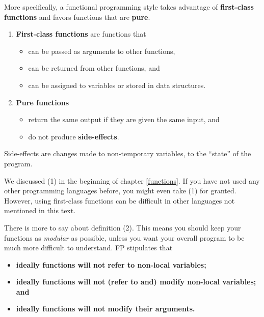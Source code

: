 \documentclass[
  12pt,
  krantz2]{krantz}
\providecommand{\tightlist}{%
  \setlength{\itemsep}{0pt}\setlength{\parskip}{0pt}}
\begin{document}
More specifically, a functional programming style takes advantage of \textbf{first-class functions} and favors functions that are \textbf{pure}.

\begin{enumerate}
\def\labelenumi{\arabic{enumi}.}
\tightlist
\item
  \textbf{First-class functions} are \citep{struc_and_interp} functions that

  \begin{itemize}
  \tightlist
  \item
    can be passed as arguments to other functions,
  \item
    can be returned from other functions, and
  \item
    can be assigned to variables or stored in data structures.
  \end{itemize}
\item
  \textbf{Pure functions}

  \begin{itemize}
  \tightlist
  \item
    return the same output if they are given the same input, and
  \item
    do not produce \textbf{side-effects}.
  \end{itemize}
\end{enumerate}

Side-effects are changes made to non-temporary variables, to the ``state'' of the program.

We discussed (1) in the beginning of chapter \ref{functions}. If you have not used any other programming languages before, you might even take (1) for granted. However, using first-class functions can be difficult in other languages not mentioned in this text.

There is more to say about definition (2). This means you should keep your functions as \emph{modular} as possible, unless you want your overall program to be much more difficult to understand. FP stipulates that

\begin{itemize}
\item
  \textbf{ideally functions will not refer to non-local variables;}
\item
  \textbf{ideally functions will not (refer to and) modify non-local variables; and}
\item
  \textbf{ideally functions will not modify their arguments.}
\end{itemize}
\end{document}

